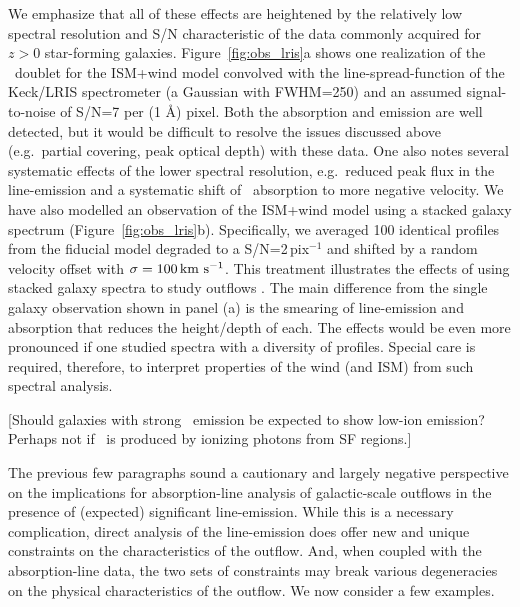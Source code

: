 \documentclass[12pt,preprint]{aastex}
\begin{document}
We emphasize that all of these effects are heightened by the
relatively low spectral resolution and S/N characteristic of the data
commonly acquired for $z>0$ star-forming galaxies.  Figure~\ref{fig:obs_lris}a
shows one realization of the \mgiid\ doublet for the ISM+wind model
convolved with the line-spread-function of the Keck/LRIS spectrometer
(a Gaussian with FWHM=250\kms) and an assumed signal-to-noise of
S/N=7 per (1 \AA) pixel.  Both the absorption
and emission are well detected, but it would be
difficult to resolve the issues discussed above (e.g.\ partial
covering, peak optical depth) with these data.  
One also notes several systematic effects of the lower spectral
resolution, e.g.\ reduced peak flux in the line-emission and a
systematic shift of \mgiia\ absorption to more negative velocity.
We have also modelled an observation of the ISM+wind model using
a stacked galaxy spectrum (Figure~\ref{fig:obs_lris}b).
Specifically, we
averaged 100 identical  profiles from the fiducial model
degraded to a S/N=2\,pix$^{-1}$ and shifted by a random velocity
offset with $\sigma = 100\, {\rm km~s^{-1}}$.  
This treatment illustrates the effects of using stacked galaxy 
spectra to study outflows
\citep[e.g.][; S10]{wcp+09,rwk+10}.   The main difference from the
single galaxy observation shown in panel (a) is the smearing of
line-emission and absorption that reduces the height/depth of each.
The effects would be even more pronounced if one studied spectra with
a diversity of  profiles.    
Special care is required, therefore, to interpret properties of the wind (and
ISM) from such spectral analysis.

[Should galaxies with strong \lya\ emission be expected to show
low-ion emission? Perhaps not if \lya\ is produced by ionizing photons
from SF regions.]


The previous few paragraphs sound a cautionary and largely negative
perspective on the implications for absorption-line analysis of
galactic-scale outflows in the presence of (expected) significant
line-emission.   While this is a necessary complication, direct analysis of
the line-emission does offer new and unique
constraints on the characteristics of the outflow.  And, when coupled
with the absorption-line data, the two sets of constraints may break
various degeneracies on the physical characteristics of the outflow.
We now consider a few examples.
\end{document}
